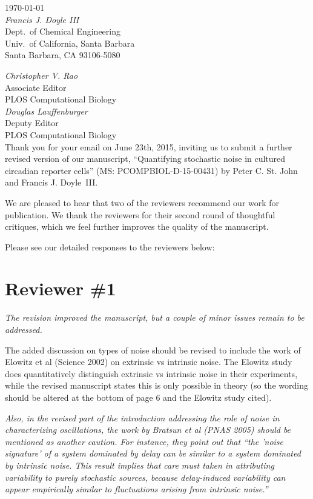 \documentclass[11pt, letterpaper]{article}
\newenvironment{reviewer}{\itshape\color{gray}}{}
\begin{document}
\begin{flushright}
\today\\[2ex]
{\itshape Francis J. Doyle III}\\
Dept.\ of Chemical Engineering\\
Univ.\ of California, Santa Barbara\\
Santa Barbara, CA 93106-5080\\
\end{flushright}

{\itshape Christopher V. Rao}\\
Associate Editor\\
PLOS Computational Biology\\

{\itshape Douglas Lauffenburger}\\
Deputy Editor\\
PLOS Computational Biology\\

Thank you for your email on June 23th, 2015, inviting us to submit a further revised version of our manuscript, ``Quantifying stochastic noise in cultured circadian reporter cells'' (MS: PCOMPBIOL-D-15-00431) by Peter C. St. John and Francis J. Doyle~III.

We are pleased to hear that two of the reviewers recommend our work for publication. We thank the reviewers for their second round of thoughtful critiques, which we feel further improves the quality of the manuscript.

Please see our detailed responses to the reviewers below: 

\section*{Reviewer \#1}
\begin{reviewer}
The revision improved the manuscript, but a couple of minor issues remain to be addressed.

The added discussion on types of noise should be revised to include the work of Elowitz et al (Science 2002) on extrinsic vs intrinsic noise. The Elowitz study does quantitatively distinguish extrinsic vs intrinsic noise in their experiments, while the revised manuscript states this is only possible in theory (so the wording should be altered at the bottom of page 6 and the Elowitz study cited). 
\end{reviewer}



\begin{reviewer}
Also, in the revised part of the introduction addressing the role of noise in characterizing oscillations, the work by Bratsun et al (PNAS 2005) should be mentioned as another caution. For instance, they point out that ``the 'noise signature' of a system dominated by delay can be similar to a system dominated by intrinsic noise. This result implies that care must taken in attributing variability to purely stochastic sources, because delay-induced variability can appear empirically similar to fluctuations arising from intrinsic noise.''
\end{reviewer}
\end{document}
